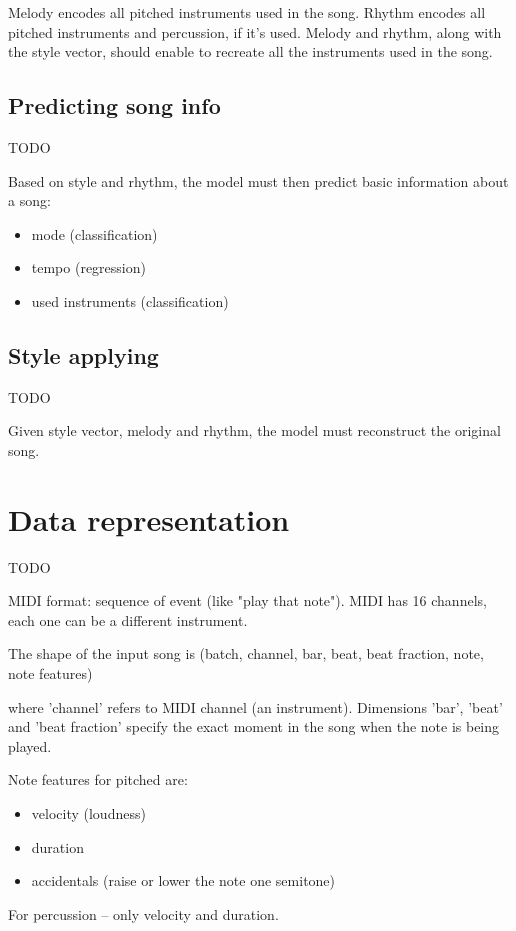 \documentclass[en]{pracamgr}
\begin{document}
Melody encodes all pitched instruments used in the song. Rhythm encodes all pitched instruments and percussion, if it's used. Melody and rhythm, along with the style vector, should enable to recreate all the instruments used in the song.

\section{Predicting song info}

TODO

Based on style and rhythm, the model must then predict basic information about a song:
\begin{itemize}
\item mode (classification)
\item tempo (regression)
\item used instruments (classification)
\end{itemize}

\section{Style applying}

TODO

Given style vector, melody and rhythm, the model must reconstruct the original song.

\chapter{Data representation}

TODO

MIDI format: sequence of event (like "play that note"). MIDI has 16 channels, each one can be a different instrument.

The shape of the input song is (batch, channel, bar, beat, beat fraction, note, note features)

where 'channel' refers to MIDI channel (an instrument). Dimensions 'bar', 'beat' and 'beat fraction' specify the exact moment in the song when the note is being played.

Note features for pitched are:
\begin{itemize}
\item velocity (loudness)
\item duration
\item accidentals (raise or lower the note one semitone)
\end{itemize}
For percussion -- only velocity and duration.
\end{document}
